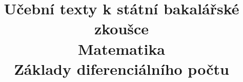\clearpage

\clearpage

\title{\LARGE Učební texty k státní bakalářské zkoušce \\ Matematika \\ Základy diferenciálního počtu}



\maketitle

\newpage
\setcounter{section}{1}



